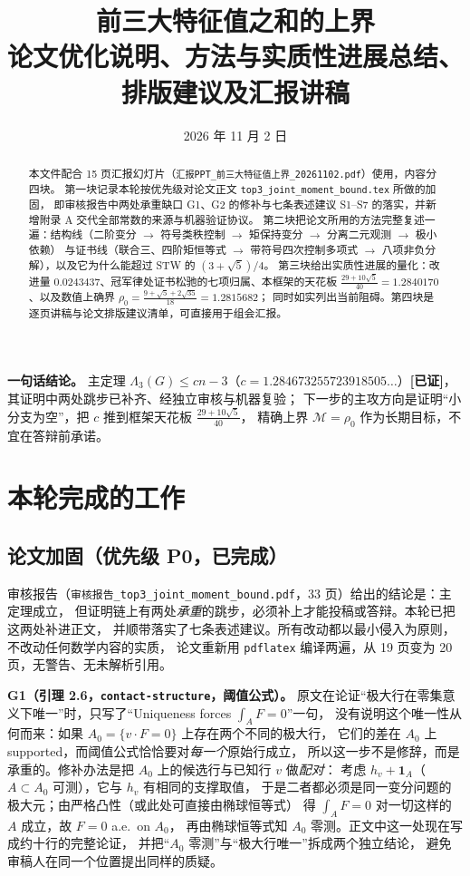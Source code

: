 \documentclass[UTF8,11pt]{ctexart}
\title{\bfseries 前三大特征值之和的上界\\[4pt]
\large 论文优化说明、方法与实质性进展总结、排版建议及汇报讲稿}
\author{}
\date{2026 年 11 月 2 日}
\newcommand{\Lam}{\Lambda}
\newcommand{\M}{\mathcal{M}}
\newcommand{\file}[1]{\texttt{#1}}
\newcommand{\ok}{\textcolor[rgb]{0.05,0.45,0.15}{\bfseries [已证]}}
\begin{document}
\maketitle
\vspace{-1.5em}

\begin{abstract}
\noindent 本文件配合 15 页汇报幻灯片（\file{汇报PPT\_前三大特征值上界\_20261102.pdf}）使用，内容分四块。
第一块记录本轮按优先级对论文正文 \file{top3\_joint\_moment\_bound.tex} 所做的加固，
即审核报告中两处承重缺口 G1、G2 的修补与七条表述建议 S1--S7 的落实，并新增附录 A 交代全部常数的来源与机器验证协议。
第二块把论文所用的方法完整复述一遍：结构线（二阶变分 $\to$ 符号类秩控制 $\to$ 矩保持变分 $\to$ 分离二元观测 $\to$ 极小依赖）
与证书线（联合三、四阶矩恒等式 $\to$ 带符号四次控制多项式 $\to$ 八项非负分解），以及它为什么能超过 STW 的 $(3+\sqrt5)/4$。
第三块给出实质性进展的量化：改进量 $0.0243437$、冠军律处证书松驰的七项归属、本框架的天花板
$\frac{29+10\sqrt5}{40}=1.2840170$、以及数值上确界 $\rho_0=\frac{9+\sqrt5+2\sqrt{35}}{18}=1.2815682$；
同时如实列出当前阻碍。第四块是逐页讲稿与论文排版建议清单，可直接用于组会汇报。
\end{abstract}

\vspace{-0.5em}
\noindent\textbf{一句话结论。}
主定理 $\Lam_3(G)\le cn-3$（$c=1.284673255723918505\ldots$）\ok，其证明中两处跳步已补齐、经独立审核与机器复验；
下一步的主攻方向是证明``小分支为空''，把 $c$ 推到框架天花板 $\frac{29+10\sqrt5}{40}$，
精确上界 $\M=\rho_0$ 作为长期目标，不宜在答辩前承诺。

\tableofcontents
\newpage

\section{本轮完成的工作}

\subsection{论文加固（优先级 P0，已完成）}

审核报告（\file{审核报告\_top3\_joint\_moment\_bound.pdf}，33 页）给出的结论是：主定理成立，
但证明链上有两处\emph{承重}的跳步，必须补上才能投稿或答辩。本轮已把这两处补进正文，
并顺带落实了七条表述建议。所有改动都以最小侵入为原则，不改动任何数学内容的实质，
论文重新用 \file{pdflatex} 编译两遍，从 19 页变为 20 页，无警告、无未解析引用。

\textbf{G1（引理 2.6，\file{contact-structure}，阈值公式）。}
原文在论证``极大行在零集意义下唯一''时，只写了``Uniqueness forces $\int_A F=0$''一句，
没有说明这个唯一性从何而来：如果 $A_0=\{v\cdot F=0\}$ 上存在两个不同的极大行，
它们的差在 $A_0$ 上 supported，而阈值公式恰恰要对\emph{每一个}原始行成立，
所以这一步不是修辞，而是承重的。修补办法是把 $A_0$ 上的候选行与已知行 $v$ 做\emph{配对}：
考虑 $h_v+\mathbf 1_A$（$A\subset A_0$ 可测），它与 $h_v$ 有相同的支撑取值，
于是二者都必须是同一变分问题的极大元；由严格凸性（或此处可直接由椭球恒等式）
得 $\int_A F=0$ 对一切这样的 $A$ 成立，故 $F=0$ a.e.\ on $A_0$，
再由椭球恒等式知 $A_0$ 零测。正文中这一处现在写成约十行的完整论证，
并把``$A_0$ 零测''与``极大行唯一''拆成两个独立结论，
避免审稿人在同一个位置提出同样的质疑。
\end{document}
